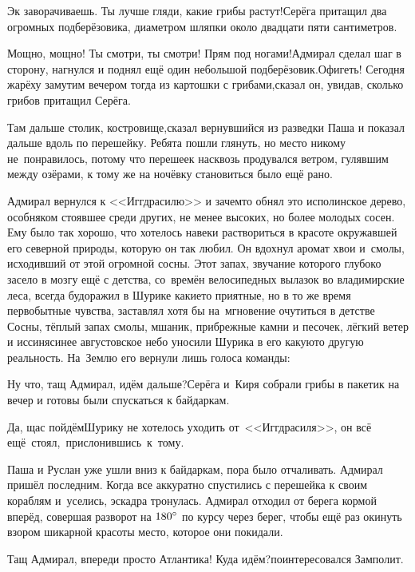 \diagdash Эк заворачиваешь. Ты лучше гляди, какие грибы растут!\mdash Серёга притащил два огромных подберёзовика, диаметром шляпки около двадцати пяти сантиметров.  

\diagdash Мощно, мощно! Ты смотри, ты смотри! Прям под ногами!\mdash Адмирал сделал шаг в сторону, нагнулся и поднял ещё один небольшой подберёзовик.\mdash Офигеть! Сегодня жарёху замутим вечером тогда из картошки с грибами,\mdash сказал он, увидав, сколько грибов притащил Серёга. 

\diagdash Там дальше столик, костровище,\mdash сказал вернувшийся из разведки Паша и показал дальше вдоль по перешейку. Ребята пошли глянуть, но место никому не~понравилось, потому что перешеек насквозь продувался ветром, гулявшим между озёрами, к тому же на ночёвку становиться было ещё рано. 

Адмирал вернулся к <<Иггдрасилю>> и зачем\sdash то обнял это исполинское дерево, особняком стоявшее среди других, не менее высоких, но более молодых сосен. Ему было так хорошо, что хотелось навеки раствориться в красоте окружавшей его северной природы, которую он так любил. Он вдохнул аромат хвои и~смолы, исходивший от этой огромной сосны. Этот запах, звучание которого глубоко засело в мозгу ещё с детства, со~времён велосипедных вылазок во владимирские леса, всегда будоражил в Шурике какие\sdash то приятные, но в то же время первобытные чувства, заставлял хотя бы на~мгновение очутиться в детстве\myldots{} Сосны, тёплый запах смолы, мшаник, прибрежные камни и песочек, лёгкий ветер и иссиня\sdash синее августовское небо уносили Шурика в его какую\sdash то другую реальность. На~Землю его вернули лишь голоса команды:

\diagdash Ну что, тащ Адмирал, идём дальше?\mdash Серёга и~Киря собрали грибы в пакетик на вечер и готовы были спускаться к байдаркам.

\diagdash Да, щас пойдём\myldots{}\mdash Шурику не хотелось уходить от~<<Иггдрасиля>>, он всё ещё~стоял,~прислонившись~к~тому. 

Паша и Руслан уже ушли вниз к байдаркам, пора было отчаливать. Адмирал пришёл последним. Когда все аккуратно спустились с перешейка к своим кораблям и~уселись, эскадра тронулась. Адмирал отходил от берега кормой вперёд, совершая разворот на $180\degree$ по курсу через берег, чтобы ещё раз окинуть взором шикарной красоты место, которое они покидали. 

\diagdash Тащ Адмирал, впереди просто Атлантика! Куда идём?\mdash поинтересовался Замполит.

